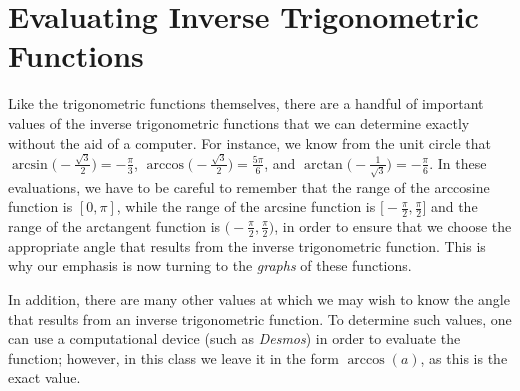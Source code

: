 \documentclass{ximera}
\begin{document}
\section{Evaluating Inverse Trigonometric Functions}
%
Like the trigonometric functions themselves, there are a handful of important values of the inverse trigonometric functions that we can determine exactly without the aid of a computer. For instance, we know from the unit circle that $\arcsin\!\Big(-\frac{\sqrt{3}}{2}\Big) = -\frac{\pi}{3}$, $\arccos\!\Big(-\frac{\sqrt{3}}{2}\Big) = \frac{5\pi}{6}$, and $\arctan\!\Big(-\frac{1}{\sqrt{3}}\Big) = -\frac{\pi}{6}$.  In these evaluations, we have to be careful to remember that the range of the arccosine function is $[0,\pi]$, while the range of the arcsine function is $\Big[-\frac{\pi}{2},\frac{\pi}{2}\Big]$ and the range of the arctangent function is $\Big(-\frac{\pi}{2},\frac{\pi}{2}\Big)$, in order to ensure that we choose the appropriate angle that results from the inverse trigonometric function. This is why our emphasis is now turning to the {\it graphs} of these functions. 
%
\par
%
In addition, there are many other values at which we may wish to know the angle that results from an inverse trigonometric function. To determine such values, one can use a computational device (such as \emph{Desmos}) in order to evaluate the function; however, in this class we leave it in the form $\arccos(a)$, as this is the exact value.%
\end{document}

